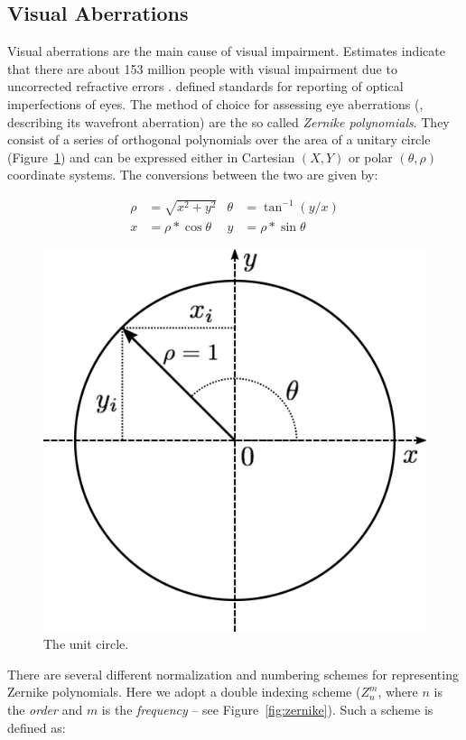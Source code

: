 
\subsection{Visual Aberrations}
\label{subsec:VisualAberrations}

Visual aberrations are the main cause of visual impairment. Estimates indicate that there are about 153 million people with visual impairment due to uncorrected refractive errors \cite{Who2007}.
%
\citet{Thibos2002} defined standards for reporting of optical imperfections of eyes. The method of choice for assessing eye aberrations (\ie, describing its wavefront aberration) are the so called {\it Zernike polynomials}. They consist of a series of orthogonal polynomials over the area of a unitary circle (Figure~\ref{fig:unitcircle}) and can be expressed either in Cartesian $(X,Y)$ or polar  $(\theta, \rho)$ coordinate systems. The conversions between the two are given by: 

\begin{equation}
	\label{eq:pol2cart}
	\begin{alignat}{2}
		\rho &= \sqrt{x^2 + y^2}	& \theta &= \tan^{-1}(y/x)  \\
		   x &= \rho*\cos\theta	  &      y &= \rho*\sin\theta
	\end{alignat}
\end{equation}


\begin{figure}[!h]
	\centering
	\includegraphics[width=0.45\linewidth]{__Images/02/unit_circle.png}
	\caption[The unit circle]{The unit circle.}
	\label{fig:unitcircle}
\end{figure}

There are several different normalization and numbering schemes for representing Zernike polynomials. Here we adopt a double indexing scheme ($Z^{m}_{n}$, where $n$ is the {\it order} and $m$ is the {\it frequency} -- see Figure~\ref{fig:zernike}).
Such a scheme is defined as:

